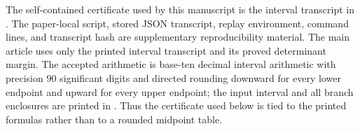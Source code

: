 \begin{remark}\label{rem:worked-diagonal-branch-certificate-main}
The self-contained certificate used by this manuscript is the interval
transcript in .  The
paper-local script, stored JSON transcript, replay environment, command lines,
and transcript hash are supplementary reproducibility material.  The main
article uses only the printed interval transcript and its proved determinant
margin.  The accepted arithmetic is base-ten decimal interval arithmetic with
precision \(90\) significant digits and directed rounding downward for every
lower endpoint and upward for every upper endpoint; the input interval and all
branch enclosures are printed in
.  Thus the
certificate used below is tied to the printed formulas rather than to a
rounded midpoint table.


\end{remark}
